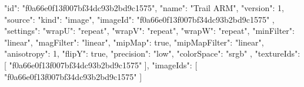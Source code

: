 {
  "id": "f0a66e0f13f007bf34dc93b2bd9c1575",
  "name": "Trail ARM",
  "version": 1,
  "source": {
    "kind": "image",
    "imageId": "f0a66e0f13f007bf34dc93b2bd9c1575"
  },
  "settings": {
    "wrapU": "repeat",
    "wrapV": "repeat",
    "wrapW": "repeat",
    "minFilter": "linear",
    "magFilter": "linear",
    "mipMap": true,
    "mipMapFilter": "linear",
    "anisotropy": 1,
    "flipY": true,
    "precision": "low",
    "colorSpace": "srgb"
  },
  "textureIds": [
    "f0a66e0f13f007bf34dc93b2bd9c1575"
  ],
  "imageIds": [
    "f0a66e0f13f007bf34dc93b2bd9c1575"
  ]
}
